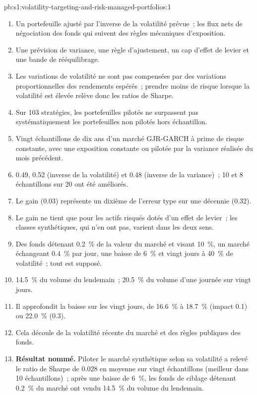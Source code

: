 \begin{solution}{pb:s1:volatility-targeting-and-risk-managed-portfolios:1}
\begin{enumerate}
\item Un portefeuille ajusté par l'inverse de la volatilité prévue~; les flux nets de négociation des fonds qui suivent des règles mécaniques d'exposition.
\item Une prévision de variance, une règle d'ajustement, un cap d'effet de levier et une bande de rééquilibrage.
\item Les variations de volatilité ne sont pas compensées par des variations proportionnelles des rendements espérés~; prendre moins de risque lorsque la volatilité est élevée relève donc les ratios de Sharpe.
\item Sur 103 stratégies, les portefeuilles pilotés ne surpassent pas systématiquement les portefeuilles non pilotés hors échantillon.
\item Vingt échantillons de dix ans d'un marché GJR-GARCH à prime de risque constante, avec une exposition constante ou pilotée par la variance réalisée du mois précédent.
\item 0.49, 0.52 (inverse de la volatilité) et 0.48 (inverse de la variance)~; 10 et 8 échantillons sur 20 ont été améliorés.
\item Le gain (0.03) représente un dixième de l'erreur type sur une décennie (0.32).
\item Le gain ne tient que pour les actifs risqués dotés d'un effet de levier~; les classes synthétiques, qui n'en ont pas, varient dans les deux sens.
\item Des fonds détenant 0.2~\% de la valeur du marché et visant 10~\%, un marché échangeant 0.4~\% par jour, une baisse de 6~\% et vingt jours à 40~\% de volatilité~; tout est supposé.
\item 14.5~\% du volume du lendemain~; 20.5~\% du volume d'une journée sur vingt jours.
\item Il approfondit la baisse sur les vingt jours, de 16.6~\% à 18.7~\% (impact 0.1) ou 22.0~\% (0.3).
\item Cela découle de la volatilité récente du marché et des règles publiques des fonds.
\item \textbf{Résultat nommé.} Piloter le marché synthétique selon sa volatilité a relevé le ratio de Sharpe de 0.028 en moyenne sur vingt échantillons (meilleur dans
10 échantillons)~; après une baisse de 6~\%, les fonds de ciblage détenant 0.2~\% du marché ont vendu 14.5~\% du volume du lendemain.

\end{enumerate}
\end{solution}
